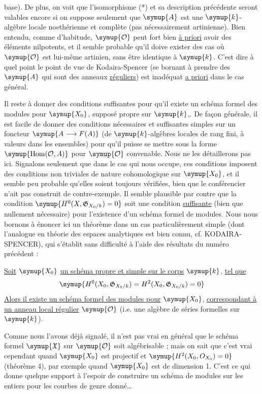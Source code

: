 base). De plus, on voit que l'isomorphisme (*) et sa description précédente
seront valables encore si on suppose seulement que $\symup{A}$ est une $\symup{k}$-algèbre
locale noethérienne et complète (pas nécessairement artinienne). Bien entendu,
comme d'habitude, $\symup{\mathcal O}$ peut fort bien \uline{à priori} avoir des
éléments nilpotents, et il semble probable qu'il doive exister des cas où
$\symup{\mathcal O}$ est lui-même artinien, sans être identique à $\symup{k}$. C'est dire à
quel point le point de vue de Kodaira-Spencer (se bornant à prendre des $\symup{A}$
qui sont des anneaux \uline{réguliers}) est inadéquat \uline{a priori} dans le cas
général.

Il reste à donner des conditions suffisantes pour qu'il existe un schéma formel
des modules pour $\symup{X_0}$, supposé propre sur $\symup{k}$,. De façon générale, il est
facile de donner des conditions nécessaires et suffisantes simples sur un
foncteur $\symup{A\longrightarrow F(A)}$ (de $\symup{k}$-algèbres locales de rang fini, à valeurs
dans les ensembles) pour qu'il puisse se mettre sous la forme
$\symup{\operatorname{Hom}(\mathcal O,A)}$ pour $\symup{\mathcal O}$ convenable. Nous ne les
détaillerons pas ici. Signalons seulement que dans le cas qui nous occupe, ces
conditions imposent des conditions non triviales de nature cohomologique sur
$\symup{X_0}$, et il semble peu probable qu'elles soient toujours vérifiées, bien que
le conférencier n'ait pas construit de contre-exemple. Il semble plausible par
contre que la condition $\symup{H^0(X,\mathfrak G_{X_0/k})=0}$ soit une condition
\uline{suffisante} (bien que nullement nécessaire) pour l'existence d'un schéma formel
de modules. Nous nous bornons à énoncer ici un théorème dans un cas
particulièrement simple (dont l'analogue en théorie des espaces analytiques est
bien connu, cf. KODAIRA-SPENCER), qui s'établit sans difficulté à l'aide des
résultats du numéro précédent :

 \uline{Soit} $\symup{X_0}$ \uline{un schéma propre et simple sur le corps} $\symup{k}$,
\uline{tel que}
\[
  \symup{H^0(X_0,\mathfrak G_{X_0/k})=H^2(X_0,\mathfrak G_{X_0/k})=0}
\]
\uline{Alors il existe un schéma formel des modules pour} $\symup{X_0}$, \uline{correspondant à un
anneau local régulier} $\symup{\mathcal O}$ (i.e. une algèbre de séries formelles sur
$\symup{k}$).

Comme nous l'avons déjà signalé, il n'est pas vrai en général que le schéma
formel $\symup{\mathfrak X}$ sur $\symup{\mathcal O}$ soit algébrisable ; mais on sait que c'est
vrai cependant quand $\symup{X_0}$ est projectif et $\symup{H^2(X_0,O_{X_0})=0}$
(théorème 4), par exemple quand $\symup{X_0}$ est de dimension 1. C'est ce qui donne
quelque support à l'espoir de construire un schéma de modules sur les entiers
pour les courbes de genre donné\ldots{}

